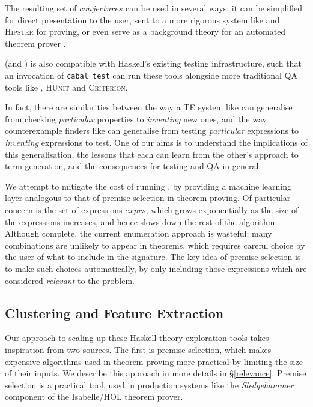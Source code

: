 The resulting set of $conjectures$ can be used in several ways: it can be simplified for direct presentation to the user, sent to a more rigorous system like \hspec{} and \textsc{Hipster} for proving, or even serve as a background theory for an automated theorem prover \citep{claessen2013automating}.

\qspec{} (and \hspec{}) is also compatible with Haskell's existing testing infrastructure, such that an invocation of \texttt{cabal test} can run these tools alongside more traditional QA tools like \qcheck{}, \textsc{HUnit} and \textsc{Criterion}.

In fact, there are similarities between the way a TE system like \qspec{} can generalise from checking \emph{particular} properties to \emph{inventing} new ones, and the way counterexample finders like \qcheck{} can generalise from testing \emph{particular} expressions to \emph{inventing} expressions to test. One of our aims is to understand the implications of this generalisation, the lessons that each can learn from the other's approach to term generation, and the consequences for testing and QA in general.

We attempt to mitigate the cost of running \qspec{}, by providing a machine learning layer analogous to that of premise selection in theorem proving. Of particular concern is the set of expressions $exprs$, which grows exponentially as the size of the expressions increases, and hence slows down the rest of the algorithm. Although complete, the current enumeration approach is wasteful: many combinations are unlikely to appear in theorems, which requires careful choice by the user of what to include in the signature. The key idea of premise selection is to make such choices automatically, by only including those expressions which are considered \emph{relevant} to the problem.

\subsection{Clustering and Feature Extraction}
\label{featureextraction}

Our approach to scaling up these Haskell theory exploration tools takes inspiration from two sources. The first is premise selection, which makes expensive algorithms used in theorem proving more practical by limiting the size of their inputs. We describe this approach in more details in \S \ref{relevance}. Premise selection is a practical tool, used in production systems like the \emph{Sledgehammer} component of the Isabelle/HOL theorem prover.

